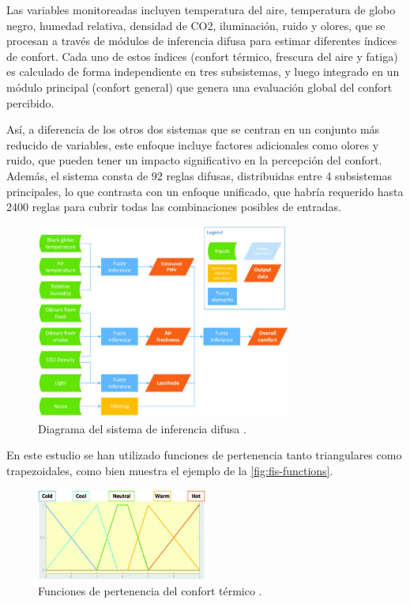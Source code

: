 Las variables monitoreadas incluyen temperatura del aire, temperatura de globo negro, humedad relativa, densidad de CO2, iluminación, ruido y olores, que se procesan a través de módulos de inferencia difusa para estimar diferentes índices de confort. Cada uno de estos índices (confort térmico, frescura del aire y fatiga) es calculado de forma independiente en tres subsistemas, y luego integrado en un módulo principal (confort general) que genera una evaluación global del confort percibido.

Así, a diferencia de los otros dos sistemas que se centran en un conjunto más reducido de variables, este enfoque incluye factores adicionales como olores y ruido, que pueden tener un impacto significativo en la percepción del confort. Además, el sistema consta de 92 reglas difusas, distribuidas entre 4 subsistemas principales, lo que contrasta con un enfoque unificado, que habría requerido hasta 2400 reglas para cubrir todas las combinaciones posibles de entradas.

\begin{figure}[H]
	\centering
	\includegraphics[width=0.75\textwidth]{imgs/fuzzy-inference-system-diagram.JPG}
	\caption{Diagrama del sistema de inferencia difusa \parencite{jablonski2018fuzzy}.}
	\label{fig:fuzzy-inference-system-diagram}
\end{figure}

En este estudio se han utilizado funciones de pertenencia tanto triangulares como trapezoidales, como bien muestra el ejemplo de la \autoref{fig:fis-functions}. 

\begin{figure}[H]
	\centering
	\includegraphics[width=0.5\textwidth]{imgs/fis-functions.JPG}
	\caption{Funciones de pertenencia del confort térmico \parencite{jablonski2018fuzzy}.}
	\label{fig:fis-functions}
\end{figure}

